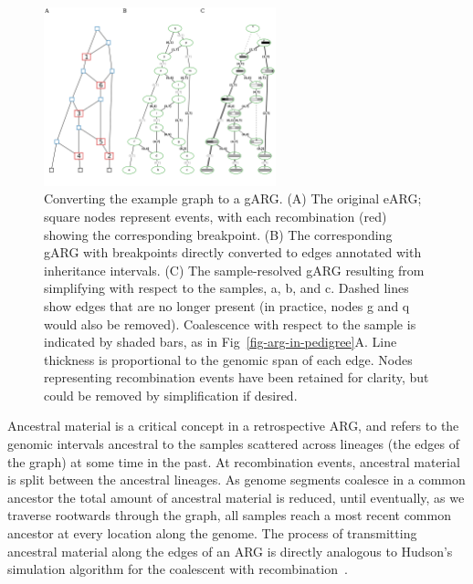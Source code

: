 \documentclass{article}
\newcommand{\noderef}[1]{\textsf{#1}}
\begin{document}
\begin{figure}
\centering
\includegraphics[width=0.6\textwidth]{illustrations/ancestry-resolution}
\caption{\label{fig-ancestry-resolution}
Converting the \citet[][Fig.~1]{wiuf1999recombination} example graph
to a gARG. (A) The original eARG; square nodes represent events, with
each recombination (red) showing the corresponding breakpoint.
(B) The corresponding gARG with breakpoints directly converted to
edges annotated with inheritance intervals.
(C) The sample-resolved gARG resulting from simplifying with respect
to the samples, \noderef{a}, \noderef{b}, and \noderef{c}.
Dashed lines show edges that are
no longer present (in practice, nodes \noderef{g} and \noderef{q} would also be removed).
Coalescence with respect to the sample is indicated by shaded bars, as
in Fig~\ref{fig-arg-in-pedigree}A.
Line thickness is proportional to the genomic span of each edge.
Nodes representing recombination events have been retained
for clarity, but could be removed by simplification if
desired.
}
\end{figure}

Ancestral material is a critical concept in a retrospective ARG,
and refers to the genomic intervals ancestral to the samples
scattered across lineages (the edges of the graph)
at some time in the past. At recombination
events, ancestral material is split between the ancestral lineages.
As genome segments coalesce in a common
ancestor the total amount of ancestral material is reduced, until
eventually, as we traverse rootwards through the graph, all
samples reach a most recent common ancestor at every location
along the genome. The process of transmitting ancestral material
along the edges of an ARG is directly analogous to Hudson's
simulation algorithm for the coalescent with
recombination~\citep{hudson1983testing,kelleher2016efficient}.
\end{document}
